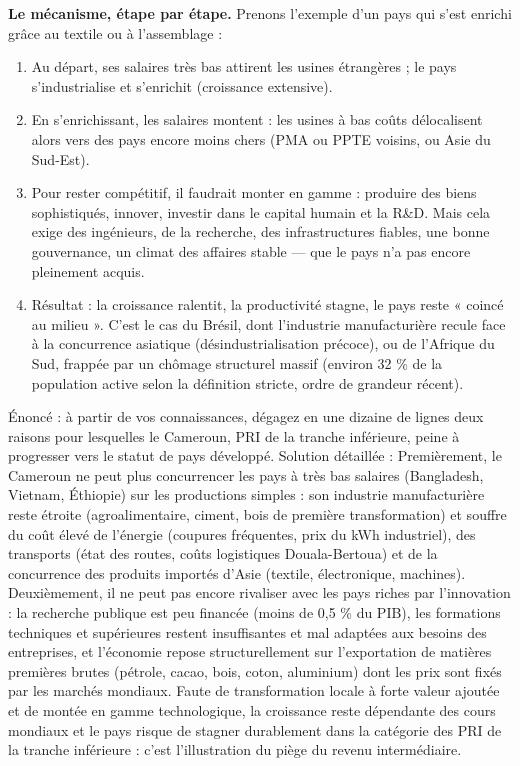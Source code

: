 \documentclass[11pt]{article}
\begin{document}
\textbf{Le mécanisme, étape par étape.} Prenons l'exemple d'un pays qui s'est enrichi grâce au textile ou à l'assemblage :
\begin{enumerate}
\item Au départ, ses salaires très bas attirent les usines étrangères ; le pays s'industrialise et s'enrichit (croissance extensive).
\item En s'enrichissant, les salaires montent : les usines à bas coûts délocalisent alors vers des pays encore moins chers (PMA ou PPTE voisins, ou Asie du Sud-Est).
\item Pour rester compétitif, il faudrait monter en gamme : produire des biens sophistiqués, innover, investir dans le capital humain et la R\&D. Mais cela exige des ingénieurs, de la recherche, des infrastructures fiables, une bonne gouvernance, un climat des affaires stable — que le pays n'a pas encore pleinement acquis.
\item Résultat : la croissance ralentit, la productivité stagne, le pays reste « coincé au milieu ». C'est le cas du Brésil, dont l'industrie manufacturière recule face à la concurrence asiatique (désindustrialisation précoce), ou de l'Afrique du Sud, frappée par un chômage structurel massif (environ 32 \% de la population active selon la définition stricte, ordre de grandeur récent).
\end{enumerate}

\begin{exoresolu}
Énoncé : à partir de vos connaissances, dégagez en une dizaine de lignes deux raisons pour lesquelles le Cameroun, PRI de la tranche inférieure, peine à progresser vers le statut de pays développé.
\tcblower
Solution détaillée : Premièrement, le Cameroun ne peut plus concurrencer les pays à très bas salaires (Bangladesh, Vietnam, Éthiopie) sur les productions simples : son industrie manufacturière reste étroite (agroalimentaire, ciment, bois de première transformation) et souffre du coût élevé de l'énergie (coupures fréquentes, prix du kWh industriel), des transports (état des routes, coûts logistiques Douala-Bertoua) et de la concurrence des produits importés d'Asie (textile, électronique, machines). Deuxièmement, il ne peut pas encore rivaliser avec les pays riches par l'innovation : la recherche publique est peu financée (moins de 0,5 \% du PIB), les formations techniques et supérieures restent insuffisantes et mal adaptées aux besoins des entreprises, et l'économie repose structurellement sur l'exportation de matières premières brutes (pétrole, cacao, bois, coton, aluminium) dont les prix sont fixés par les marchés mondiaux. Faute de transformation locale à forte valeur ajoutée et de montée en gamme technologique, la croissance reste dépendante des cours mondiaux et le pays risque de stagner durablement dans la catégorie des PRI de la tranche inférieure : c'est l'illustration du piège du revenu intermédiaire.
\end{exoresolu}
\end{document}
